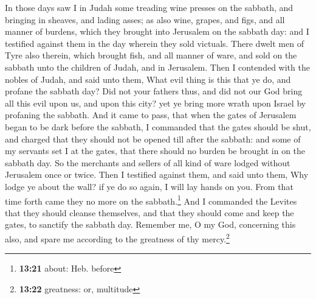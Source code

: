  In those days saw I in Judah some treading wine presses
on the sabbath, and bringing in sheaves, and lading asses; as also wine,
grapes, and figs, and all manner of burdens, which they brought into
Jerusalem on the sabbath day: and I testified against them in the day
wherein they sold victuals.  There dwelt men of Tyre also
therein, which brought fish, and all manner of ware, and sold on the
sabbath unto the children of Judah, and in Jerusalem. 
Then I contended with the nobles of Judah, and said unto them, What evil
thing is this that ye do, and profane the sabbath day? 
Did not your fathers thus, and did not our God bring all this evil upon
us, and upon this city? yet ye bring more wrath upon Israel by profaning
the sabbath.  And it came to pass, that when the gates of
Jerusalem began to be dark before the sabbath, I commanded that the
gates should be shut, and charged that they should not be opened till
after the sabbath: and some of my servants set I at the gates, that
there should no burden be brought in on the sabbath day. 
So the merchants and sellers of all kind of ware lodged without
Jerusalem once or twice.  Then I testified against them,
and said unto them, Why lodge ye about the wall? if ye do so again, I
will lay hands on you. From that time forth came they no more on the
sabbath.\footnote{\textbf{13:21} about: Heb. before}  And
I commanded the Levites that they should cleanse themselves, and that
they should come and keep the gates, to sanctify the sabbath day.
Remember me, O my God, concerning this also, and spare me according to
the greatness of thy mercy.\footnote{\textbf{13:22} greatness: or,
  multitude}

